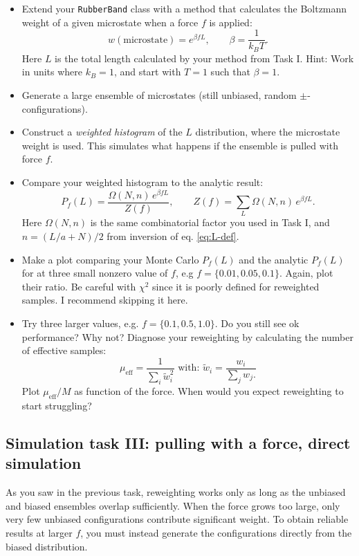 \documentclass[11pt]{article}
\begin{document}
\begin{itemize}
  \item Extend your \texttt{RubberBand} class with a method that calculates the Boltzmann weight of a given microstate when a force $f$ is applied:
  \[
    w(\text{microstate}) = e^{\beta f L}, \qquad \beta = \frac{1}{k_B T}.
  \]
  Here $L$ is the total length calculated by your method from Task I. Hint: Work in units where $k_B = 1$, and start with $T = 1$ such that $\beta = 1$.
  \item Generate a large ensemble of microstates (still unbiased, random $\pm$-configurations). 
  \item Construct a \textit{weighted histogram} of the $L$ distribution, where the microstate weight is used. This simulates what happens if the ensemble is pulled with force $f$.
  \item Compare your weighted histogram to the analytic result:
  \[
    P_f(L) = \frac{\Omega(N,n)\, e^{\beta f L}}{Z(f)}, \qquad 
    Z(f) = \sum_{L}\Omega(N,n)\, e^{\beta f L}.
  \]
  Here $\Omega(N,n)$ is the same combinatorial factor you used in Task I, and $n = (L/a+N)/2$ from inversion of eq. \eqref{eq:L-def}.
  \item Make a plot comparing your Monte Carlo $P_f(L)$ and the analytic $P_f(L)$ for at three small nonzero value of $f$, e.g $f = \{0.01, 0.05, 0.1\}$. 
  Again, plot their ratio. Be careful with $\chi^2$ since it is poorly defined for reweighted samples. I recommend skipping it here.
  \item Try three larger values, e.g. $f = \{0.1, 0.5, 1.0\}$. Do you still see ok performance? Why not? Diagnose your reweighting by calculating the number of effective samples:
  \[\mu_\text{eff} = \frac{1}{\sum_i \tilde{w}^2_i}\text{ with: } \tilde{w}_i = \frac{w_i}{\sum_j w_j.}\]
  Plot $\mu_\text{eff}/M$ as function of the force. When would you expect reweighting to start struggling?
\end{itemize}

\subsection*{Simulation task III: pulling with a force, direct simulation}
As you saw in the previous task, reweighting works only as long as the unbiased and biased ensembles overlap sufficiently. When the force grows too large, only very few unbiased configurations contribute significant weight.
To obtain reliable results at larger $f$, you must instead generate the configurations directly from the biased distribution.
\end{document}
